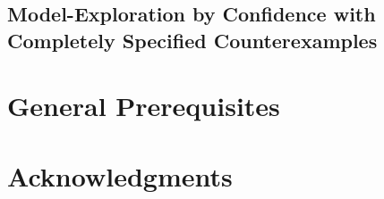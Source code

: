 \subsection{Model-Exploration by Confidence with Completely Specified Counterexamples}
\label{sec:model-expl-conf}

\section{General Prerequisites}
\label{sec:prerequisites}

%

\section{Acknowledgments}
\label{sec:acknowledgements}



